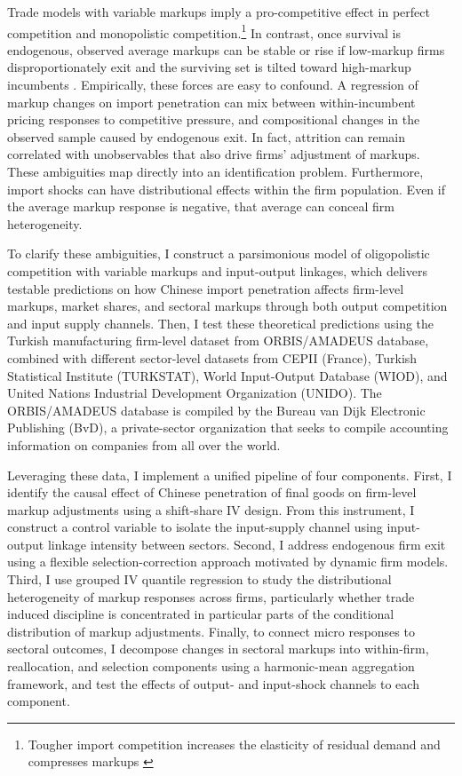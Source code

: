 \documentclass[12pt]{article}
\begin{document}
Trade models with variable markups imply a pro-competitive effect in perfect competition and monopolistic competition.\footnote{Tougher import competition increases the elasticity of residual demand and compresses markups \parencite{melitzMarketSizeTrade2008, edmondCompetitionMarkupsGains2015}} In contrast, once survival is endogenous, observed average markups can be stable or rise if low-markup firms disproportionately exit and the surviving set is tilted toward high-markup incumbents \parencite{arkolakisElusiveProCompetitiveEffects2019}. Empirically, these forces are easy to confound. A regression of markup changes on import penetration can mix between within-incumbent pricing responses to competitive pressure, and compositional changes in the observed sample caused by endogenous exit. In fact, attrition can remain correlated with unobservables that also drive firms' adjustment of markups. These ambiguities map directly into an identification problem. Furthermore, import shocks can have distributional effects within the firm population. Even if the average markup response is negative, that average can conceal firm heterogeneity.

To clarify these ambiguities, I construct a parsimonious model of oligopolistic competition with variable markups and input-output linkages, which delivers testable predictions on how Chinese import penetration affects firm-level markups, market shares, and sectoral markups through both output competition and input supply channels. Then, I test these theoretical predictions using the Turkish manufacturing firm-level dataset from ORBIS/AMADEUS database, combined with different sector-level datasets from CEPII (France), Turkish Statistical Institute (TURKSTAT), World Input-Output Database (WIOD), and United Nations Industrial Development Organization (UNIDO). The ORBIS/AMADEUS database is compiled by the Bureau van Dijk Electronic Publishing (BvD), a private-sector organization that seeks to compile accounting information on companies from all over the world. 

Leveraging these data, I implement a unified pipeline of four components. First, I identify the causal effect of Chinese penetration of final goods on firm-level markup adjustments using a shift-share IV design. From this instrument, I construct a control variable to isolate the input-supply channel using input-output linkage intensity between sectors. Second, I address endogenous firm exit using a flexible selection-correction approach motivated by dynamic firm models. Third, I use grouped IV quantile regression to study the distributional heterogeneity of markup responses across firms, particularly whether trade induced discipline is concentrated in particular parts of the conditional distribution of markup adjustments. Finally, to connect micro responses to sectoral outcomes, I decompose changes in sectoral markups into within-firm, reallocation, and selection components using a harmonic-mean aggregation framework, and test the effects of output- and input-shock channels to each component.
\end{document}
